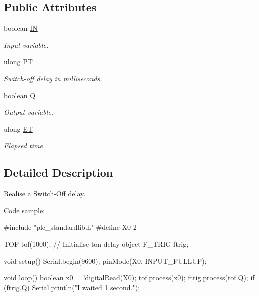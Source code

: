 \subsection*{Public Attributes}
\begin{DoxyCompactItemize}
\item 
\hypertarget{class_t_o_f_a93883cdb7b40a16266790edaaf5c7365}{boolean \hyperlink{class_t_o_f_a93883cdb7b40a16266790edaaf5c7365}{I\+N}}\label{class_t_o_f_a93883cdb7b40a16266790edaaf5c7365}

\begin{DoxyCompactList}\small\item\em Input variable. \end{DoxyCompactList}\item 
\hypertarget{class_t_o_f_a17d9d8b4fe947a7c2ea90d1df23d78d9}{ulong \hyperlink{class_t_o_f_a17d9d8b4fe947a7c2ea90d1df23d78d9}{P\+T}}\label{class_t_o_f_a17d9d8b4fe947a7c2ea90d1df23d78d9}

\begin{DoxyCompactList}\small\item\em Switch-\/off delay in milliseconds. \end{DoxyCompactList}\item 
\hypertarget{class_t_o_f_a3935bf275e875177ccaa9f92d14eb705}{boolean \hyperlink{class_t_o_f_a3935bf275e875177ccaa9f92d14eb705}{Q}}\label{class_t_o_f_a3935bf275e875177ccaa9f92d14eb705}

\begin{DoxyCompactList}\small\item\em Output variable. \end{DoxyCompactList}\item 
\hypertarget{class_t_o_f_ace0c91cc206c62a2f774e267a4210aa1}{ulong \hyperlink{class_t_o_f_ace0c91cc206c62a2f774e267a4210aa1}{E\+T}}\label{class_t_o_f_ace0c91cc206c62a2f774e267a4210aa1}

\begin{DoxyCompactList}\small\item\em Elapsed time. \end{DoxyCompactList}\end{DoxyCompactItemize}


\subsection{Detailed Description}
Realise a Switch-\/\+Off delay. 

Code sample\+: \begin{DoxyVerb}#include "plc_standardlib.h"
#define X0 2

TOF tof(1000);  // Initialise ton delay object
F_TRIG ftrig;

void setup() {
    Serial.begin(9600);
    pinMode(X0, INPUT_PULLUP);
}

void loop() {
    boolean x0 = !digitalRead(X0);
    tof.process(x0);
    ftrig.process(tof.Q);
    if (ftrig.Q) {
        Serial.println("I waited 1 second.");
    }
}\end{DoxyVerb}
 

